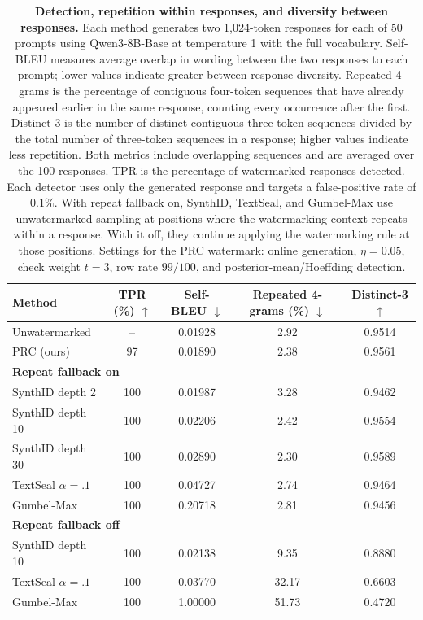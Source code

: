 \begin{table}[t]
\centering
\small
\caption{\textbf{Detection, repetition within responses, and diversity
between responses.} Each method generates two 1,024-token responses
for each of 50 prompts using Qwen3-8B-Base at temperature 1 with the
full vocabulary. Self-BLEU measures average overlap in wording between
the two responses to each prompt; lower values indicate greater
between-response diversity. Repeated 4-grams is the percentage of
contiguous four-token sequences that have already appeared earlier in
the same response, counting every occurrence after the first.
Distinct-3 is the number of distinct contiguous three-token sequences
divided by the total number of three-token sequences in a response;
higher values indicate less repetition. Both metrics include
overlapping sequences and are averaged over the 100 responses.
TPR is the percentage of watermarked responses detected. Each detector
uses only the generated response and targets a false-positive rate of
$0.1\%$. With repeat fallback on, SynthID, TextSeal, and Gumbel-Max
use unwatermarked sampling at positions where the watermarking context
repeats within a response. With it off, they continue applying the
watermarking rule at those positions. Settings for the PRC watermark:
online generation, $\eta=0.05$, check weight $t=3$,
row rate $99/100$, and posterior-mean/Hoeffding detection.}
\label{tab:matched-selfbleu-levels}
\setlength{\tabcolsep}{3pt}
\renewcommand{\arraystretch}{1.15}

\begin{tabular*}{\textwidth}{@{\extracolsep{\fill}}lcccc@{}}
\toprule
Method
& TPR (\%) $\uparrow$
& Self-BLEU $\downarrow$
& Repeated 4-grams (\%) $\downarrow$
& Distinct-3 $\uparrow$ \\
\midrule

Unwatermarked
& -- & 0.01928 & 2.92 & 0.9514 \\
PRC (ours)
& 97 & 0.01890 & 2.38 & 0.9561 \\

\midrule
\multicolumn{5}{l}{\textbf{Repeat fallback on}} \\
SynthID depth 2
& 100 & 0.01987 & 3.28 & 0.9462 \\
SynthID depth 10
& 100 & 0.02206 & 2.42 & 0.9554 \\
SynthID depth 30
& 100 & 0.02890 & 2.30 & 0.9589 \\
TextSeal $\alpha=.1$
& 100 & 0.04727 & 2.74 & 0.9464 \\
Gumbel-Max
& 100 & 0.20718 & 2.81 & 0.9456 \\

\midrule
\multicolumn{5}{l}{\textbf{Repeat fallback off}} \\
SynthID depth 10
& 100 & 0.02138 & 9.35 & 0.8880 \\
TextSeal $\alpha=.1$
& 100 & 0.03770 & 32.17 & 0.6603 \\
Gumbel-Max
& 100 & 1.00000 & 51.73 & 0.4720 \\

\bottomrule
\end{tabular*}
\end{table}
